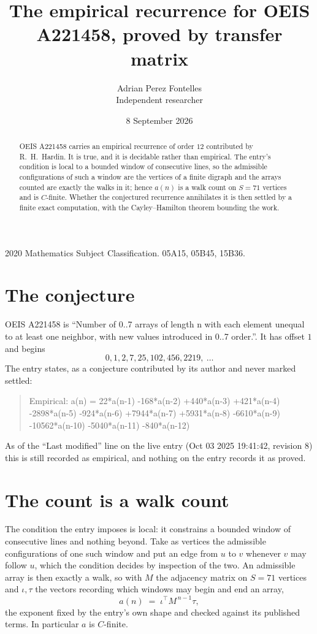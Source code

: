 \documentclass[11pt,a4paper]{article}
\title{The empirical recurrence for OEIS A221458, proved by transfer matrix}
\author{Adrian Perez Fontelles\\ \small Independent researcher}
\date{8 September 2026}
\theoremstyle{plain}
\theoremstyle{definition}
\begin{document}
\maketitle

\begin{abstract}
OEIS A221458 carries an empirical recurrence of order $12$ contributed by R.~H.~Hardin. It is
true, and it is decidable rather than empirical. The entry's condition is local to a bounded window of consecutive lines, so
the admissible configurations of such a window are the vertices of a finite digraph and the
arrays counted are exactly the walks in it; hence $a(n)$ is a walk count on $S=71$ vertices
and is $C$-finite. Whether the conjectured recurrence annihilates it is then settled by a
finite exact computation, with the Cayley--Hamilton theorem bounding the work.
\end{abstract}

\noindent\small 2020 Mathematics Subject Classification. 05A15, 05B45, 15B36.\normalsize

\section{The conjecture}

OEIS A221458 is ``Number of 0..7 arrays of length n with each element unequal to at least one neighbor, with new values introduced in 0..7 order.''. It has offset $1$ and begins
\[
0, 1, 2, 7, 25, 102, 456, 2219,\ \dots
\]
The entry states, as a conjecture contributed by its author and never marked settled:
\begin{quote}
Empirical: a(n) = 22*a(n-1) -168*a(n-2) +440*a(n-3) +421*a(n-4) -2898*a(n-5) -924*a(n-6) +7944*a(n-7) +5931*a(n-8) -6610*a(n-9) -10562*a(n-10) -5040*a(n-11) -840*a(n-12)
\end{quote}
As of the ``Last modified'' line on the live entry (Oct 03 2025 19:41:42, revision 8) this is still
recorded as empirical, and nothing on the entry records it as proved.

\section{The count is a walk count}

The condition the entry imposes is local: it constrains a bounded window of consecutive lines and nothing beyond. Take as
vertices the admissible configurations of one such window and put an edge from $u$ to $v$
whenever $v$ may follow $u$, which the condition decides by inspection of the two. An
admissible array is then exactly a walk, so with $M$ the adjacency matrix on $S=71$ vertices
and $\iota,\tau$ the vectors recording which windows may begin and end an array,
\[
a(n)\;=\;\iota^{\!\top}M^{\,n-1}\tau ,
\]
the exponent fixed by the entry's own shape and checked against its published terms. In
particular $a$ is $C$-finite.
\end{document}
